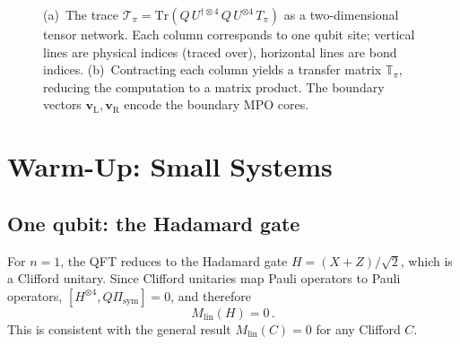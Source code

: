 \documentclass[11pt,a4paper]{article}
\theoremstyle{definition}
\theoremstyle{remark}
\newcommand{\Mlin}{M_{\mathrm{lin}}}
\renewcommand{\Tr}{\mathrm{Tr}}
\begin{document}
\begin{figure}[ht]
\caption{(a)~The trace $\mathcal{T}_\pi = \Tr(Q\,U^{\dagger\otimes 4}\,Q\,U^{\otimes 4}\,T_\pi)$ as a two-dimensional tensor network.
Each column corresponds to one qubit site; vertical lines are physical indices (traced over), horizontal lines are bond indices.
(b)~Contracting each column yields a transfer matrix $\mathbb{T}_\pi$, reducing the computation to a matrix product.
The boundary vectors $\mathbf{v}_{\mathrm{L}}, \mathbf{v}_{\mathrm{R}}$ encode the boundary MPO cores.}
\label{fig:transfer_matrix}
\end{figure}

\section{Warm-Up: Small Systems}
\label{sec:warmup}

\subsection{One qubit: the Hadamard gate}

For $n=1$, the QFT reduces to the Hadamard gate $H = (X+Z)/\sqrt{2}$, which is a Clifford unitary. Since Clifford unitaries map Pauli operators to Pauli operators, $[H^{\otimes 4}, Q\Pi_{\mathrm{sym}}]=0$, and therefore
\begin{equation}
  \Mlin(H) = 0\,.
\end{equation}
This is consistent with the general result $\Mlin(C)=0$ for any Clifford $C$.
\end{document}
